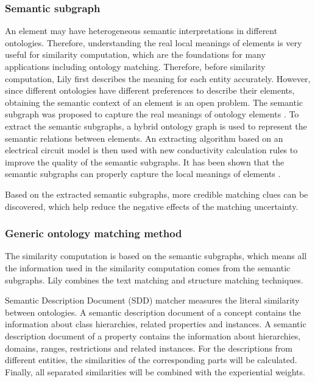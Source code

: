 \documentclass[runningheads]{llncs}
\begin{document}
\subsubsection{Semantic subgraph} An element may have heterogeneous semantic interpretations in different ontologies. Therefore, understanding the real local meanings of elements is very useful for similarity computation, which are the foundations for many applications including ontology matching. Therefore, before similarity computation, Lily first describes the meaning for each entity accurately. However, since different ontologies have different preferences to describe their elements, obtaining the semantic context of an element is an open problem. The semantic subgraph was proposed to capture the real meanings of ontology elements \cite{subgraph}. To extract the semantic subgraphs, a hybrid ontology graph is used to represent the semantic relations between elements. An extracting algorithm based on an electrical circuit model is then used with new conductivity calculation rules to improve the quality of the semantic subgraphs. It has been shown that the semantic subgraphs can properly capture the local meanings of elements \cite{subgraph}. \par
Based on the extracted semantic subgraphs, more credible matching clues can be discovered, which help reduce the negative effects of the matching uncertainty. \par
\subsubsection{Generic ontology matching method} The similarity computation is based on the semantic subgraphs, which means all the information used in the similarity computation comes from the semantic subgraphs. Lily combines the text matching and structure matching techniques. \par
Semantic Description Document (SDD) matcher measures the literal similarity between ontologies. A semantic description document of a concept contains the information about class hierarchies, related properties and instances. A semantic description document of a property contains the information about hierarchies, domains, ranges, restrictions and related instances. For the descriptions from different entities, the similarities of the corresponding parts will be calculated. Finally, all separated similarities will be combined with the experiential weights. \par
\end{document}
